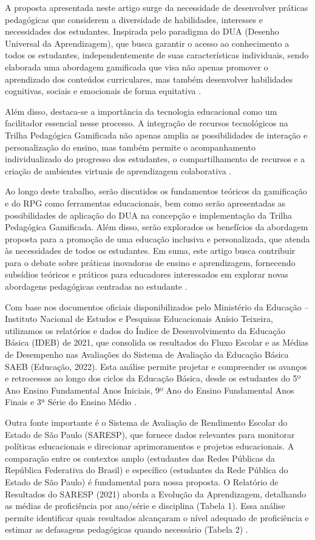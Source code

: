 A proposta apresentada neste artigo surge da necessidade de desenvolver práticas pedagógicas que considerem a diversidade de habilidades, interesses e necessidades dos estudantes. Inspirada pelo paradigma do DUA (Desenho Universal da Aprendizagem), que busca garantir o acesso ao conhecimento a todos os estudantes, independentemente de suas características individuais, sendo elaborada uma abordagem gamificada que visa não apenas promover o aprendizado dos conteúdos curriculares, mas também desenvolver habilidades cognitivas, sociais e emocionais de forma equitativa \textcite{de2022game}.

Além disso, destaca-se a importância da tecnologia educacional como um facilitador essencial nesse processo. A integração de recursos tecnológicos na Trilha Pedagógica Gamificada não apenas amplia as possibilidades de interação e personalização do ensino, mas também permite o acompanhamento individualizado do progresso dos estudantes, o compartilhamento de recursos e a criação de ambientes virtuais de aprendizagem colaborativa \textcite{questatlantis}.

Ao longo deste trabalho, serão discutidos os fundamentos teóricos da gamificação e do RPG como ferramentas educacionais, bem como serão apresentadas as possibilidades de aplicação do DUA na concepção e implementação da Trilha Pedagógica Gamificada. Além disso, serão explorados os benefícios da abordagem proposta para a promoção de uma educação inclusiva e personalizada, que atenda às necessidades de todos os estudantes. Em suma, este artigo busca contribuir para o debate sobre práticas inovadoras de ensino e aprendizagem, fornecendo subsídios teóricos e práticos para educadores interessados em explorar novas abordagens pedagógicas centradas no estudante \textcite{campbell1989heroi}.

Com base nos documentos oficiais disponibilizados pelo Ministério da Educação – Instituto Nacional de Estudos e Pesquisas Educacionais Anísio Teixeira, utilizamos os relatórios e dados do Índice de Desenvolvimento da Educação Básica (IDEB) de 2021, que consolida os resultados do Fluxo Escolar e as Médias de Desempenho nas Avaliações do Sistema de Avaliação da Educação Básica SAEB (Educação, 2022). Esta análise permite projetar e compreender os avanços e retrocessos ao longo dos ciclos da Educação Básica, desde os estudantes do 5º Ano Ensino Fundamental Anos Iniciais, 9º Ano do Ensino Fundamental Anos Finais e 3ª Série do Ensino Médio \textcite{detecnicas}.

Outra fonte importante é o Sistema de Avaliação de Rendimento Escolar do Estado de São Paulo (SARESP), que fornece dados relevantes para monitorar políticas educacionais e direcionar aprimoramentos e projetos educacionais. A comparação entre os contextos amplo (estudantes das Redes Públicas da República Federativa do Brasil) e específico (estudantes da Rede Pública do Estado de São Paulo) é fundamental para nossa proposta. O Relatório de Resultados do SARESP (2021) aborda a Evolução da Aprendizagem, detalhando as médias de proficiência por ano/série e disciplina (Tabela 1). Essa análise permite identificar quais resultados alcançaram o nível adequado de proficiência e estimar as defasagens pedagógicas quando necessário (Tabela 2) \textcite{kroneidolo}.

